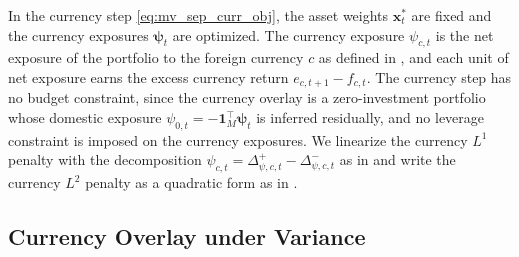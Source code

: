 In the currency step \eqref{eq:mv_sep_curr_obj}, the asset weights $\bm{x}_t^*$ are fixed and the currency exposures
$\bm{\psi}_t$ are optimized. The currency exposure $\psi_{c,t}$ is the net
exposure of the portfolio to the foreign currency $c$ as defined in , and each unit of
net exposure earns the excess currency return $e_{c,t+1} - f_{c,t}$. The currency step has no budget constraint, since
the currency overlay is a zero-investment portfolio whose domestic exposure $\psi_{0,t} = -\bm{1}_M^\top \bm{\psi}_t$ is
inferred residually, and no leverage constraint is imposed on the currency exposures. We linearize the currency $L^1$
penalty with the decomposition $\psi_{c,t} = \Delta_{\psi,c,t}^+ - \Delta_{\psi,c,t}^-$ as in  and write
the currency $L^2$ penalty as a quadratic form as in .

\subsection{Currency Overlay under Variance} \label{app:mv_var_sep_curr}

